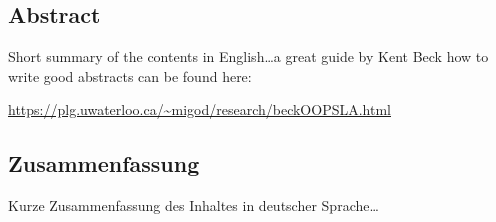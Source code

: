 \begingroup
\let\clearpage\relax
\let\cleardoublepage\relax
\let\cleardoublepage\relax

\begin{otherlanguage}{american}
	\chapter*{Abstract}
	Short summary of the contents in English\dots a great guide by
	Kent Beck how to write good abstracts can be found here:
	\begin{center}
		\url{https://plg.uwaterloo.ca/~migod/research/beckOOPSLA.html}
	\end{center}
\end{otherlanguage}

\newpage
\cleardoublepage

\begin{otherlanguage}{ngerman}
	\chapter*{Zusammenfassung}
	Kurze Zusammenfassung des Inhaltes in deutscher Sprache\dots
\end{otherlanguage}

\endgroup

\vfill
